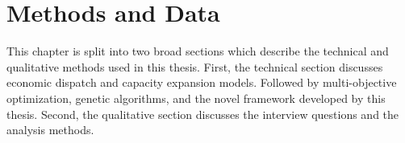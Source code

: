 \chapter{Methods and Data}

This chapter is split into two broad sections which describe the technical and
qualitative methods used in this thesis. First, the technical section discusses
economic dispatch and capacity expansion models. Followed by multi-objective
optimization, genetic algorithms, and the novel framework developed by this
thesis. Second, the qualitative section discusses the interview questions and
the analysis methods.

